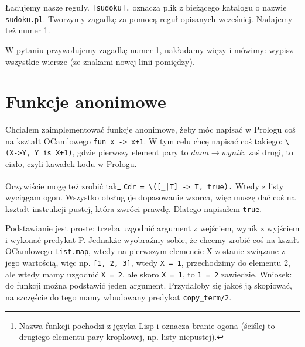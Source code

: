 \documentclass[12pt,a4paper]{article}
\begin{document}
Ładujemy nasze reguły. \verb+[sudoku].+ oznacza plik z bieżącego katalogu o nazwie \verb+sudoku.pl+. Tworzymy zagadkę za pomocą reguł opisanych wcześniej. Nadajemy też numer 1.

W pytaniu przywołujemy zagadkę numer 1, nakładamy więzy i mówimy: wypisz wszystkie wiersze (ze znakami nowej linii pomiędzy).

\section{Funkcje anonimowe}
Chciałem zaimplementować funkcje anonimowe, żeby móc napisać w Prologu coś na kształt OCamlowego \verb!fun x -> x+1!. W tym celu chcę napisać coś takiego: \verb!\(X->Y, Y is X+1)!, gdzie pierwszy element pary to $dana\rightarrow wynik$, zaś drugi, to ciało, czyli kawałek kodu w Prologu.

Oczywiście mogę też zrobić tak\footnote{Nazwa funkcji pochodzi z języka Lisp i oznacza branie ogona (ściślej to drugiego elementu pary kropkowej, np. listy niepustej).} \verb!Cdr = \([_|T] -> T, true).! Wtedy z listy wyciągam ogon. Wszystko obsługuje dopasowanie wzorca, więc muszę dać coś na kształt instrukcji pustej, która zwróci prawdę. Dlatego napisałem \verb+true+.

Podstawianie jest proste: trzeba uzgodnić argument z wejściem, wynik z wyjściem i wykonać predykat P. Jednakże wyobraźmy sobie, że chcemy zrobić coś na kszałt OCamlowego \verb+List.map+, wtedy na pierwszym elemencie X zostanie związane z jego wartością, więc np. \verb+[1, 2, 3]+, wtedy \verb+X = 1+, przechodzimy do elementu 2, ale wtedy mamy uzgodnić \verb+X = 2+, ale skoro \verb+X = 1+, to \verb+1 = 2+ zawiedzie. Wniosek: do funkcji można podstawić jeden argument. Przydałoby się jakoś ją skopiować, na szczęście do tego mamy wbudowany predykat \verb+copy_term/2+.
\end{document}

